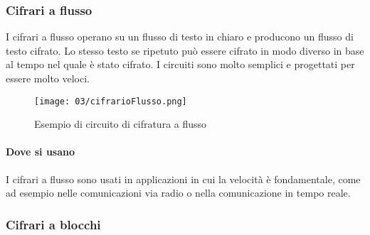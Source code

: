         \subsubsection{Cifrari a flusso}
            I cifrari a flusso operano su un flusso di testo in chiaro e producono un flusso di testo cifrato. Lo stesso testo se ripetuto può essere cifrato in modo diverso in base al tempo nel quale è stato cifrato. I circuiti sono molto semplici e progettati per essere molto veloci.
            \begin{figure}[H]
                \centering
                \texttt{[image: 03/cifrarioFlusso.png]}
                \caption{Esempio di circuito di cifratura a flusso}
            \end{figure}
            \paragraph{Dove si usano} I cifrari a flusso sono usati in applicazioni in cui la velocità è fondamentale, come ad esempio nelle comunicazioni via radio o nella comunicazione in tempo reale.
        \subsubsection{Cifrari a blocchi}